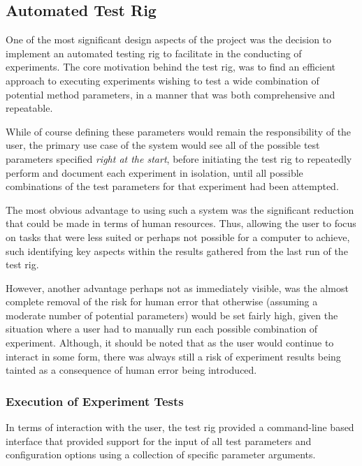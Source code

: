 
\subsection{Automated Test Rig}

One of the most significant design aspects of the project was the decision to implement an automated testing rig to facilitate in the conducting of experiments. The core motivation behind the test rig, was to find an efficient approach to executing experiments wishing to test a wide combination of potential method parameters, in a manner that was both comprehensive and repeatable. 

While of course defining these parameters would remain the responsibility of the user, the primary use case of the system would see all of the possible test parameters specified \textit{right at the start}, before initiating the test rig to repeatedly perform and document each experiment in isolation, until all possible combinations of the test parameters for that experiment had been attempted. 

The most obvious advantage to using such a system was the significant reduction that could be made in terms of human resources. Thus, allowing the user to focus on tasks that were less suited or perhaps not possible for a computer to achieve, such identifying key aspects within the results gathered from the last run of the test rig. 

However, another advantage perhaps not as immediately visible, was the almost complete removal of the risk for human error that otherwise (assuming a moderate number of potential parameters) would be set fairly high, given the situation where a user had to manually run each possible combination of experiment. Although, it should be noted that as the user would continue to interact in some form, there was always still a risk of experiment results being tainted as a consequence of human error being introduced. 


\subsubsection{Execution of Experiment Tests}

In terms of interaction with the user, the test rig provided a command-line based interface that provided support for the input of all test parameters and configuration options using a collection of specific parameter arguments. 

